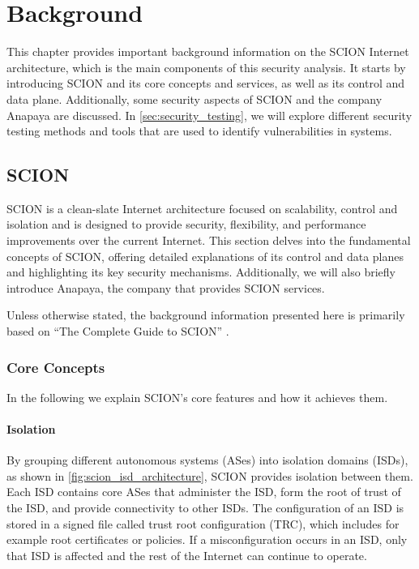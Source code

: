 \chapter{Background}
\label{ch:background}



This chapter provides important background information on the SCION Internet architecture, which is the main components of this security analysis.
It starts by introducing SCION and its core concepts and services, as well as its control and data plane.
Additionally, some security aspects of SCION and the company Anapaya are discussed.
In \cref{sec:security_testing}, we will explore different security testing methods and tools that are used to identify vulnerabilities in systems.


\section{SCION}

SCION \cite{Perrig2022} is a clean-slate Internet architecture focused on scalability, control and isolation and is designed to provide security, flexibility, and performance improvements over the current Internet.
This section delves into the fundamental concepts of SCION, offering detailed explanations of its control and data planes and highlighting its key security mechanisms.
Additionally, we will also briefly introduce Anapaya, the company that provides SCION services.

Unless otherwise stated, the background information presented here is primarily based on  ``The Complete Guide to SCION'' \cite{Perrig2022}.

\subsection{Core Concepts}
In the following we explain SCION's core features and how it achieves them.
\subsubsection{Isolation}

By grouping different autonomous systems (ASes) into isolation domains (ISDs), as shown in \cref{fig:scion_isd_architecture}, SCION provides isolation between them.
Each ISD contains core ASes that administer the ISD, form the root of trust of the ISD, and provide connectivity to other ISDs.
The configuration of an ISD is stored in a signed file called trust root configuration (TRC), which includes for example root certificates or policies.
If a misconfiguration occurs in an ISD, only that ISD is affected and the rest of the Internet can continue to operate.

